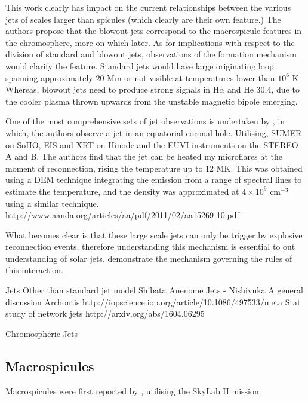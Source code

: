 This work clearly has impact on the current relationships between the various jets of scales larger than spicules (which clearly are their own feature.)
The authors propose that the blowout jets correspond to the macrospicule features in the chromosphere, more on which later.
As for implications with respect to the division of standard and blowout jets, observations of the formation mechanism would clarify the feature.
Standard jets would have large originating loop spanning approximately $20$ Mm or not visible at temperatures lower than  $10^6$ K.
Whereas, blowout jets need to produce strong signals in H$\alpha$ and He $30.4$, due to the cooler plasma thrown upwards from the unstable magnetic bipole emerging.

One of the most comprehensive sets of jet observations is undertaken by \cite{Majarska2011}, in which, the authors observe a jet in an equatorial coronal hole.
Utilising, SUMER on SoHO, EIS and XRT on Hinode and the EUVI instruments on the STEREO A and B.
The authors find that the jet can be heated my microflares at the moment of reconnection, rising the temperature up to $12$ MK.
This was obtained using a DEM technique integrating the emission from a range of spectral lines to estimate the temperature, and the density was approximated at $4 \times 10^9$ cm$^{-3}$ using a similar technique.
http://www.aanda.org/articles/aa/pdf/2011/02/aa15269-10.pdf


What becomes clear is that these large scale jets can only be trigger by explosive reconnection events, therefore understanding this mechanism is essential to out understanding of solar jets.
\cite{Archontis2005} demonstrate the mechanism governing the rules of this interaction.







Jets
Other than standard jet model Shibata
Anenome Jets - Nishivuka
A general discussion Archontis http://iopscience.iop.org/article/10.1086/497533/meta
Stat study of network jets http://arxiv.org/abs/1604.06295


Chromospheric Jets




\subsection{Macrospicules}

Macrospicules were first reported by \cite{Bohlin1975}, utilising the SkyLab II mission.




